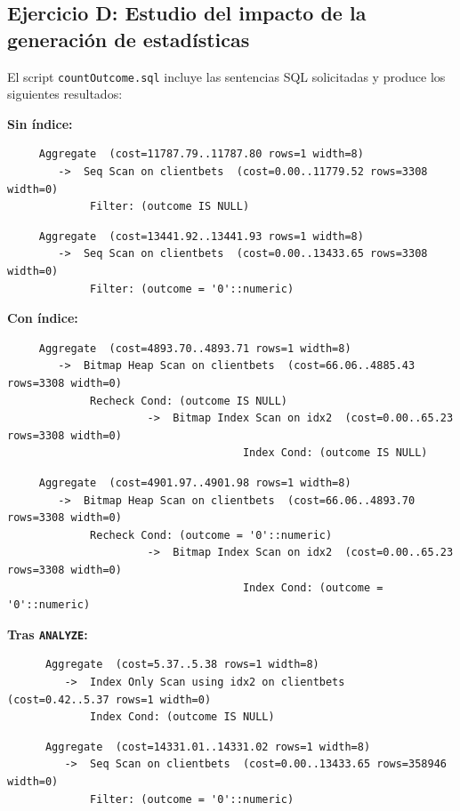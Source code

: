 \documentclass{article}
\begin{document}
\subsection{Ejercicio D: {\small Estudio del impacto de la generación de estadísticas}}
El script \texttt{countOutcome.sql} incluye las sentencias SQL solicitadas y produce los siguientes resultados:

\medbreak
\textbf{Sin índice:}
\vspace{-1mm}
\begin{lstlisting}
     Aggregate  (cost=11787.79..11787.80 rows=1 width=8)
        ->  Seq Scan on clientbets  (cost=0.00..11779.52 rows=3308 width=0)
             Filter: (outcome IS NULL)
\end{lstlisting}
\begin{lstlisting}
     Aggregate  (cost=13441.92..13441.93 rows=1 width=8)
        ->  Seq Scan on clientbets  (cost=0.00..13433.65 rows=3308 width=0)
             Filter: (outcome = '0'::numeric)
\end{lstlisting}
\textbf{Con índice:}
\vspace{-1mm}
\begin{lstlisting}
     Aggregate  (cost=4893.70..4893.71 rows=1 width=8)
        ->  Bitmap Heap Scan on clientbets  (cost=66.06..4885.43 rows=3308 width=0)
             Recheck Cond: (outcome IS NULL)
                      ->  Bitmap Index Scan on idx2  (cost=0.00..65.23 rows=3308 width=0)
                                     Index Cond: (outcome IS NULL)
\end{lstlisting}
\begin{lstlisting}
     Aggregate  (cost=4901.97..4901.98 rows=1 width=8)
        ->  Bitmap Heap Scan on clientbets  (cost=66.06..4893.70 rows=3308 width=0)
             Recheck Cond: (outcome = '0'::numeric)
                      ->  Bitmap Index Scan on idx2  (cost=0.00..65.23 rows=3308 width=0)
                                     Index Cond: (outcome = '0'::numeric)
\end{lstlisting}
\textbf{Tras \texttt{ANALYZE}:}
\vspace{-1mm}
\begin{lstlisting}
      Aggregate  (cost=5.37..5.38 rows=1 width=8)
         ->  Index Only Scan using idx2 on clientbets  (cost=0.42..5.37 rows=1 width=0)
             Index Cond: (outcome IS NULL)
\end{lstlisting}
\begin{lstlisting}
      Aggregate  (cost=14331.01..14331.02 rows=1 width=8)
         ->  Seq Scan on clientbets  (cost=0.00..13433.65 rows=358946 width=0)
             Filter: (outcome = '0'::numeric)
\end{lstlisting}
\end{document}
